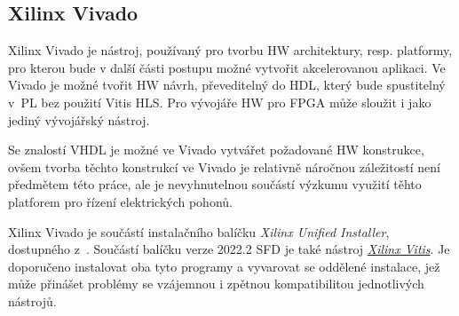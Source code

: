 \documentclass[a4paper, twoside, 11pt]{article}
\begin{document}
		\subsection{Xilinx Vivado}\label{subsec:xilinx-vivado}
			Xilinx Vivado je nástroj, používaný pro tvorbu HW architektury, resp. platformy, pro kterou bude v další části postupu možné vytvořit akcelerovanou aplikaci. Ve Vivado je možné tvořit HW návrh, převeditelný do HDL, který bude spustitelný v~PL bez použití Vitis HLS. Pro vývojáře HW pro FPGA může sloužit i jako jediný vývojářský nástroj.\par
			Se znalostí VHDL je možné ve Vivado vytvářet požadované HW konstrukce, ovšem tvorba těchto konstrukcí ve Vivado je relativně náročnou záležitostí není předmětem této práce, ale je nevyhnutelnou součástí výzkumu využití těhto platforem pro řízení elektrických pohonů.\par
			Xilinx Vivado je součástí instalačního balíčku \textit{Xilinx Unified Installer}, dostupného z~\cite{xilinx-downloads}. Součástí balíčku verze 2022.2 SFD je také nástroj \hyperref[subsec:xilinx-vitis]{\textit{Xilinx Vitis}}. Je doporučeno instalovat oba tyto programy a vyvarovat se oddělené instalace, jež může přinášet problémy se vzájemnou i zpětnou kompatibilitou jednotlivých nástrojů.
\end{document}
